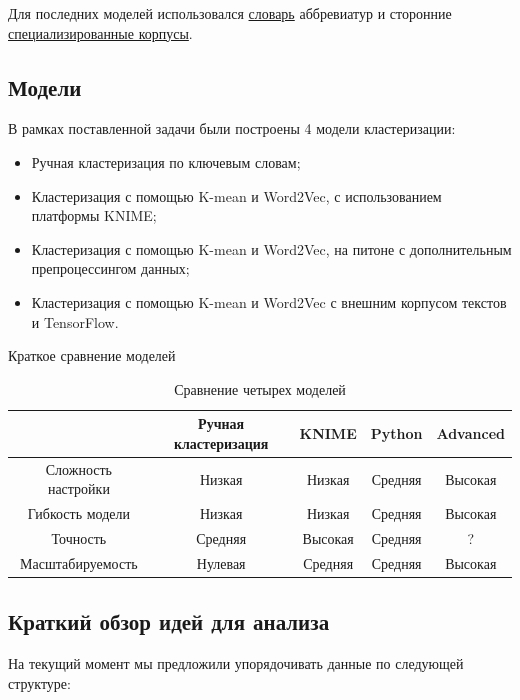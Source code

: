 \documentclass{article}
\begin{document}
Для последних моделей использовался \href{http://www.tech.nftn.ru/dir/c/22}{словарь}
аббревиатур и сторонние \href{https://rusvectores.org/ru/}{специализированные корпусы}.

\newpage

\subsection{Модели}
В рамках поставленной задачи были построены 4 модели кластеризации:
\begin{itemize}
    \item Ручная кластеризация по ключевым словам;
    \item Кластеризация с помощью K-mean и Word2Vec, с использованием платформы KNIME;
    \item Кластеризация с помощью K-mean и Word2Vec, на питоне с дополнительным препроцессингом данных;
    \item Кластеризация с помощью K-mean и Word2Vec с внешним корпусом текстов и TensorFlow.
\end{itemize}

Краткое сравнение моделей

\begin{table}[h!]
    \centering
    \begin{tabular}{|c|c|c|c|c|}
    \hline
                        & Ручная кластеризация & KNIME  & Python  & Advanced  \\ \hline
    Сложность настройки & Низкая               & Низкая & Средняя & Высокая   \\ \hline
    Гибкость модели     & Низкая               & Низкая & Средняя & Высокая   \\ \hline
    Точность            & Средняя              & Высокая& Средняя & ?         \\ \hline
    Масштабируемость    & Нулевая              & Средняя& Средняя & Высокая   \\ \hline
    \end{tabular}
    \caption{Сравнение четырех моделей}
    \label{tab:my_label}
\end{table}

\subsection{Краткий обзор идей для анализа}

На текущий момент мы предложили упорядочивать данные по следующей структуре:
\end{document}
